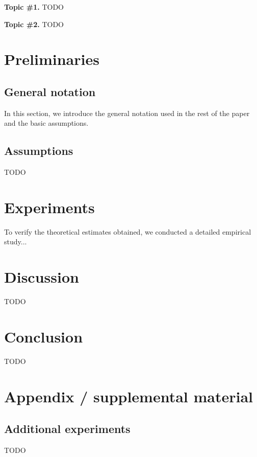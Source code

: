 \documentclass{article}
\begin{document}
\textbf{Topic \#1.}
TODO

\textbf{Topic \#2.}
TODO

\section{Preliminaries}\label{sec:prelim}

\subsection{General notation}

In this section, we introduce the general notation used in the rest of the paper and the basic assumptions. 

\subsection{Assumptions} 

TODO

\section{Experiments}\label{sec:exp}

To verify the theoretical estimates obtained, we conducted a detailed empirical study...

\section{Discussion}\label{sec:disc}

TODO

\section{Conclusion}\label{sec:concl}

TODO







\newpage
\appendix
\section{Appendix / supplemental material}\label{app}

\subsection{Additional experiments}\label{app:exp}

TODO
\end{document}
